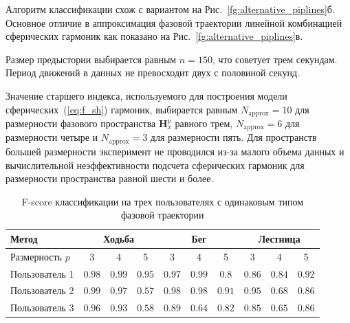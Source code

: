 \documentclass[article,14pt,subf,href,colorlinks=true
]{disser}
\begin{document}
Алгоритм классификации схож с вариантом на Рис.~\ref{fg:alternative_piplines}б. Основное отличие в аппроксимация фазовой траектории линейной комбинацией сферических гармоник как показано на Рис.~\ref{fg:alternative_piplines}в.

Размер предыстории выбирается равным $n = 150$, что советует трем секундам.
Период движений в данных не превосходит двух с половиной секунд.

Значение старшего индекса, используемого для построения модели сферических~(\ref{eq:f_sh}) гармоник, выбирается равным $N_{\text{approx}} = 10$ для размерности фазового пространства $\mathbf{H}_{x}^{p}$ равного трем, $N_{\text{approx}} = 6$ для размерности четыре и $N_{\text{approx}} = 3$ для размерности пять.
Для пространств большей размерности эксперимент не проводился из-за малого объема данных и  вычислительной неэффективности подсчета сферических гармоник для размерности пространства равной шести и более.

\begin{table}[H]
    \caption{F-score классификации на трех пользователях с одинаковым типом фазовой траектории}
    \label{tbl:accuracy_table_all}
    \centering\medskip\tabcolsep=6pt\small
    \begin{tabular}{|l||ccc|ccc|ccc|}
    \hline
        Метод
            & \multicolumn{3}{c|}{Ходьба}
            & \multicolumn{3}{c|}{Бег}
            & \multicolumn{3}{c|}{Лестница}\\
    \hline\hline
        Размерность $p$
            & 3 & 4 & 5
            & 3 & 4 & 5
            & 3 & 4 & 5\\
    \hline
        {Пользователь 1}
            & $0.98$ & $0.99$ & $0.95$ %
            & $0.97$ & $0.99$ & $0.8$ %
            & $0.86$ & $0.84$ & $0.92$ \\%
    \hline
        {Пользователь 2}
            & $0.99$ & $0.97$ & $0.57$ %
            & $0.98$ & $0.98$ & $0.91$ %
            & $0.95$ & $0.68$ & $0.86$ \\%
    \hline
        {Пользователь 3}
            & $0.96$ & $0.93$ & $0.58$ %
            & $0.89$ & $0.64$ & $0.82$ %
            & $0.85$ & $0.65$ & $0.86$ \\%
    \hline
    \end{tabular}
\end{table}
\end{document}
